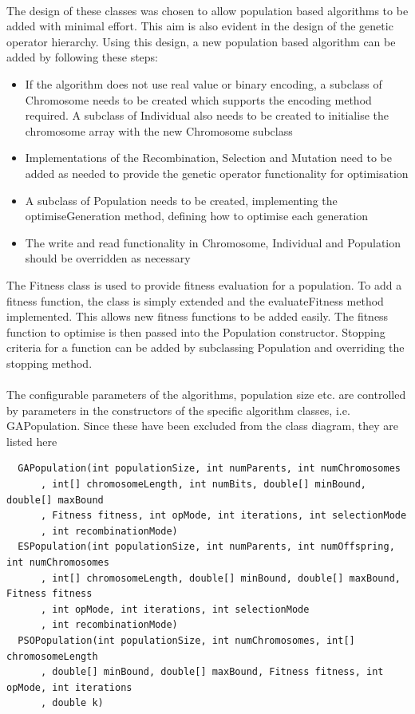 \\The design of these classes was chosen to allow population based algorithms to be added with minimal effort. This aim is also evident in the design of the genetic operator hierarchy. Using this design, a new population based algorithm can be added by following these steps:
\begin{itemize}
  \item{If the algorithm does not use real value or binary encoding, a subclass of Chromosome needs to be created which supports the encoding method required. A subclass of Individual also needs to be created to initialise the chromosome array with the new Chromosome subclass}
  \item{Implementations of the Recombination, Selection and Mutation need to be added as needed to provide the genetic operator functionality for optimisation}
  \item{A subclass of Population needs to be created, implementing the optimiseGeneration method, defining how to optimise each generation}
  \item{The write and read functionality in Chromosome, Individual and Population should be overridden as necessary}
\end{itemize}
The Fitness class is used to provide fitness evaluation for a population. To add a fitness function, the class is simply extended and the evaluateFitness method implemented. This allows new fitness functions to be added easily. The fitness function to optimise is then passed into the Population constructor. Stopping criteria for a function can be added by subclassing Population and overriding the stopping method.
\\\\The configurable parameters of the algorithms, population size etc. are controlled by parameters in the constructors of the specific algorithm classes, i.e. GAPopulation. Since these have been excluded from the class diagram, they are listed here
\singlespaced
\begin{verbatim}
  GAPopulation(int populationSize, int numParents, int numChromosomes
      , int[] chromosomeLength, int numBits, double[] minBound, double[] maxBound
      , Fitness fitness, int opMode, int iterations, int selectionMode
      , int recombinationMode)
  ESPopulation(int populationSize, int numParents, int numOffspring, int numChromosomes
      , int[] chromosomeLength, double[] minBound, double[] maxBound, Fitness fitness
      , int opMode, int iterations, int selectionMode
      , int recombinationMode)
  PSOPopulation(int populationSize, int numChromosomes, int[] chromosomeLength
      , double[] minBound, double[] maxBound, Fitness fitness, int opMode, int iterations
      , double k)
\end{verbatim}
\doublespaced


